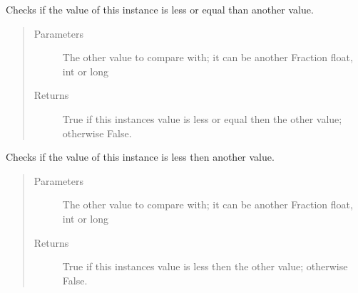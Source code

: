 \documentclass[letterpaper,10pt,english]{sphinxmanual}
\begin{document}
\begin{fulllineitems}
\begin{fulllineitems}
\begin{quote}
\begin{description}
\end{description}\end{quote}

\end{fulllineitems}


\begin{fulllineitems}
\label{\detokenize{fraction:fraction.Fraction.__le__}}
Checks if the value of this instance is less or equal than another value.
\begin{quote}\begin{description}
\item[{Parameters}] \leavevmode
{} \textendash{} The other value to compare with; it can be another Fraction float, int or long

\item[{Returns}] \leavevmode
True if this instances value is less or equal then the other value; otherwise False.

\end{description}\end{quote}

\end{fulllineitems}


\begin{fulllineitems}
\label{\detokenize{fraction:fraction.Fraction.__lt__}}
Checks if the value of this instance is less then another value.
\begin{quote}\begin{description}
\item[{Parameters}] \leavevmode
{} \textendash{} The other value to compare with; it can be another Fraction float, int or long

\item[{Returns}] \leavevmode
True if this instances value is less then the other value; otherwise False.

\end{description}\end{quote}

\end{fulllineitems}



\end{fulllineitems}
\end{document}
